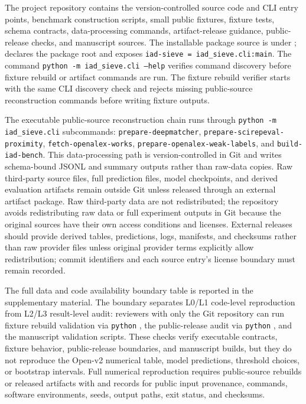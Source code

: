 \documentclass[11pt]{article}
\begin{document}
\begin{sloppypar}

The project repository contains the version-controlled source code and CLI entry points, benchmark construction scripts, small public fixtures, fixture tests, schema contracts, data-processing commands, artifact-release guidance, public-release checks, and manuscript sources. The installable package source is under ;  declares the package root and exposes \texttt{iad-sieve = iad\_sieve.cli:main}. The command \texttt{python -m iad\_sieve.cli --help} verifies command discovery before fixture rebuild or artifact commands are run. The fixture rebuild verifier starts with the same CLI discovery check and rejects missing public-source reconstruction commands before writing fixture outputs.

The executable public-source reconstruction chain runs through \texttt{python -m iad\_sieve.cli} subcommands: \texttt{prepare-deepmatcher}, \texttt{prepare-scirepeval-proximity}, \texttt{fetch-openalex-works}, \texttt{prepare-openalex-weak-labels}, and \texttt{build-iad-bench}. This data-processing path is version-controlled in Git and writes schema-bound JSONL and summary outputs rather than raw-data copies. Raw third-party source files, full prediction files, model checkpoints, and derived evaluation artifacts remain outside Git unless released through an external artifact package. Raw third-party data are not redistributed; the repository avoids redistributing raw data or full experiment outputs in Git because the original sources have their own access conditions and licenses. External releases should provide derived tables, predictions, logs, manifests, and checksums rather than raw provider files unless original provider terms explicitly allow redistribution; commit identifiers and each source entry's license boundary must remain recorded.

The full data and code availability boundary table is reported in the supplementary material. The boundary separates L0/L1 code-level reproduction from L2/L3 result-level audit: reviewers with only the Git repository can run fixture rebuild validation via \texttt{python} , the public-release audit via \texttt{python} , and the manuscript validation scripts. These checks verify executable contracts, fixture behavior, public-release boundaries, and manuscript builds, but they do not reproduce the Open-v2 numerical table, model predictions, threshold choices, or bootstrap intervals. Full numerical reproduction requires public-source rebuilds or released artifacts with  and  records for public input provenance, commands, software environments, seeds, output paths, exit status, and checksums.


\end{sloppypar}
\end{document}
